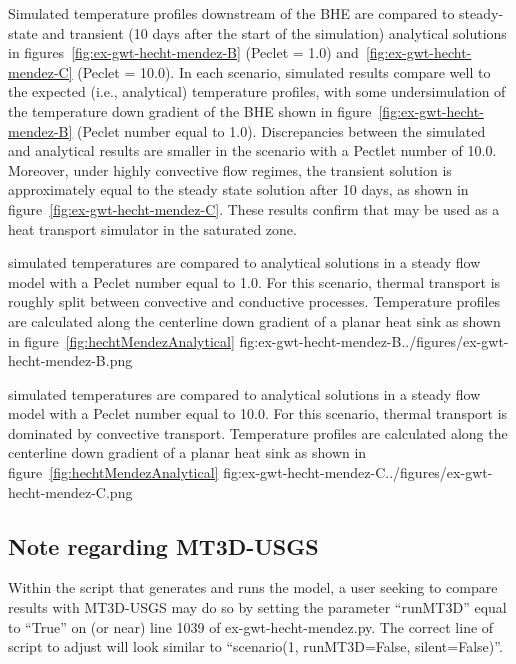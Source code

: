 Simulated temperature profiles downstream of the BHE are compared to steady-state and transient (10 days after the start of the simulation) analytical solutions in figures~\ref{fig:ex-gwt-hecht-mendez-B} (Peclet = 1.0) and~\ref{fig:ex-gwt-hecht-mendez-C} (Peclet = 10.0).  In each scenario, simulated results compare well to the expected (i.e., analytical) temperature profiles, with some undersimulation of the temperature down gradient of the BHE shown in figure~\ref{fig:ex-gwt-hecht-mendez-B} (Peclet number equal to 1.0).  Discrepancies between the simulated and analytical results are smaller in the scenario with a Pectlet number of 10.0.  Moreover, under highly convective flow regimes, the transient solution is approximately equal to the steady state solution after 10 days, as shown in figure~\ref{fig:ex-gwt-hecht-mendez-C}.  These results confirm that \mf may be used as a heat transport simulator in the saturated zone.

\begin{StandardFigure}{
                                     \mf simulated temperatures are compared to analytical solutions in a steady flow model with a Peclet number equal to 1.0. For this scenario, thermal transport is roughly split between convective and conductive processes.  Temperature profiles are calculated along the centerline down gradient of a planar heat sink as shown in figure~\ref{fig:hechtMendezAnalytical}
                                     }{fig:ex-gwt-hecht-mendez-B}{../figures/ex-gwt-hecht-mendez-B.png}
\end{StandardFigure}                                 

\begin{StandardFigure}{
                                     \mf simulated temperatures are compared to analytical solutions in a steady flow model with a Peclet number equal to 10.0. For this scenario, thermal transport is dominated by convective transport.  Temperature profiles are calculated along the centerline down gradient of a planar heat sink as shown in figure~\ref{fig:hechtMendezAnalytical}
                                     }{fig:ex-gwt-hecht-mendez-C}{../figures/ex-gwt-hecht-mendez-C.png}
\end{StandardFigure}             
       
\subsection{Note regarding MT3D-USGS}             

Within the script that generates and runs the \mf model, a user seeking to compare \mf results with MT3D-USGS may do so by setting the parameter ``runMT3D'' equal to ``True'' on (or near) line 1039 of ex-gwt-hecht-mendez.py.  The correct line of script to adjust will look similar to ``scenario(1, runMT3D=False, silent=False)''.
